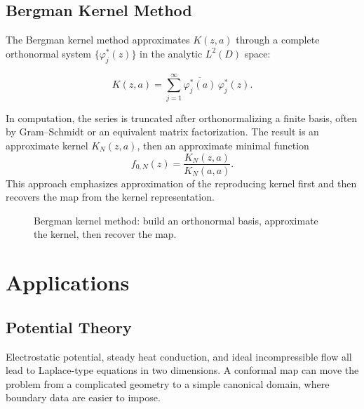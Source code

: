 \documentclass[12pt,a4paper]{article}
\begin{document}
\subsection{Bergman Kernel Method}

The Bergman kernel method approximates \(K(z,a)\) through a complete orthonormal system \(\{\varphi_j^*(z)\}\) in the analytic \(L^2(D)\) space:
\begin{formulabox}
\[
K(z,a)=\sum_{j=1}^{\infty}\overline{\varphi_j^*(a)}\,\varphi_j^*(z).
\]
\end{formulabox}
In computation, the series is truncated after orthonormalizing a finite basis, often by Gram--Schmidt or an equivalent matrix factorization. The result is an approximate kernel \(K_N(z,a)\), then an approximate minimal function
\[
f_{0,N}(z)=\frac{K_N(z,a)}{K_N(a,a)}.
\]
This approach emphasizes approximation of the reproducing kernel first and then recovers the map from the kernel representation.

\begin{figure}[H]
\centering
{}
\caption{Bergman kernel method: build an orthonormal basis, approximate the kernel, then recover the map.}
\end{figure}










\section{Applications}

\subsection{Potential Theory}

Electrostatic potential, steady heat conduction, and ideal incompressible flow all lead to Laplace-type equations in two dimensions. A conformal map can move the problem from a complicated geometry to a simple canonical domain, where boundary data are easier to impose.
\end{document}
